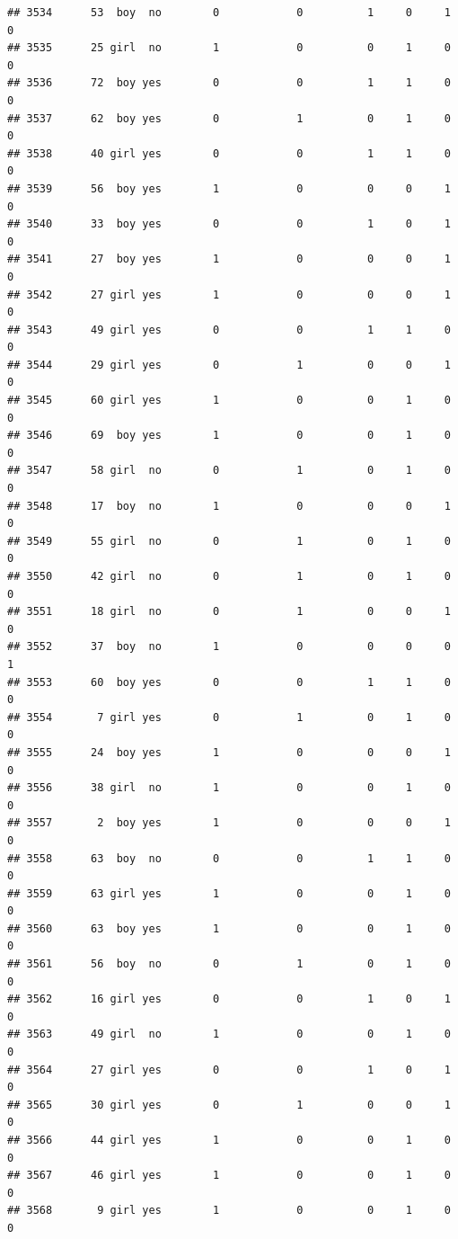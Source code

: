 \documentclass[man]{apa6}
\begin{document}
\begin{verbatim}
## 3534      53  boy  no        0            0          1     0     1     0
## 3535      25 girl  no        1            0          0     1     0     0
## 3536      72  boy yes        0            0          1     1     0     0
## 3537      62  boy yes        0            1          0     1     0     0
## 3538      40 girl yes        0            0          1     1     0     0
## 3539      56  boy yes        1            0          0     0     1     0
## 3540      33  boy yes        0            0          1     0     1     0
## 3541      27  boy yes        1            0          0     0     1     0
## 3542      27 girl yes        1            0          0     0     1     0
## 3543      49 girl yes        0            0          1     1     0     0
## 3544      29 girl yes        0            1          0     0     1     0
## 3545      60 girl yes        1            0          0     1     0     0
## 3546      69  boy yes        1            0          0     1     0     0
## 3547      58 girl  no        0            1          0     1     0     0
## 3548      17  boy  no        1            0          0     0     1     0
## 3549      55 girl  no        0            1          0     1     0     0
## 3550      42 girl  no        0            1          0     1     0     0
## 3551      18 girl  no        0            1          0     0     1     0
## 3552      37  boy  no        1            0          0     0     0     1
## 3553      60  boy yes        0            0          1     1     0     0
## 3554       7 girl yes        0            1          0     1     0     0
## 3555      24  boy yes        1            0          0     0     1     0
## 3556      38 girl  no        1            0          0     1     0     0
## 3557       2  boy yes        1            0          0     0     1     0
## 3558      63  boy  no        0            0          1     1     0     0
## 3559      63 girl yes        1            0          0     1     0     0
## 3560      63  boy yes        1            0          0     1     0     0
## 3561      56  boy  no        0            1          0     1     0     0
## 3562      16 girl yes        0            0          1     0     1     0
## 3563      49 girl  no        1            0          0     1     0     0
## 3564      27 girl yes        0            0          1     0     1     0
## 3565      30 girl yes        0            1          0     0     1     0
## 3566      44 girl yes        1            0          0     1     0     0
## 3567      46 girl yes        1            0          0     1     0     0
## 3568       9 girl yes        1            0          0     1     0     0

\end{verbatim}
\end{document}
